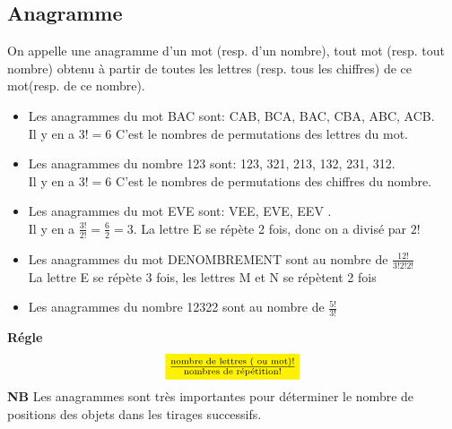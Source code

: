 \subsection*{Anagramme}
\begin{definition}
On appelle une  anagramme d'un mot (resp. d'un nombre), tout mot (resp. tout nombre) obtenu à partir de toutes les lettres (resp. tous les chiffres) de ce mot(resp. de ce nombre).
\end{definition}
\begin{example}
\begin{itemize}
\item Les anagrammes du mot BAC sont: CAB, BCA, BAC, CBA, ABC, ACB.\\
Il y en a $ 3!=6 $ C'est le nombres de permutations des lettres du mot.\\
\item Les anagrammes du nombre 123 sont: 123, 321, 213, 132, 231, 312.\\
Il y en a $ 3!=6 $ C'est le nombres de permutations des chiffres du nombre.\\
\item Les anagrammes du mot EVE sont: VEE, EVE, EEV .\\
Il y en a $ \frac{3!}{2!}=\frac{6}{2} =3$. La lettre E se répète  2 fois, donc on a divisé par $ 2! $ \\
\item Les anagrammes du mot DENOMBREMENT sont au nombre de $ \frac{12!}{3! 2!2!} $\\ La lettre E  se répète  3 fois, les lettres  M et N se répètent  2 fois \\
\item Les anagrammes du nombre 12322 sont au nombre de $ \frac{5!}{3!} $
\end{itemize}
\end{example}
\textbf{Régle}\\
\[ \colorbox{yellow}{$\frac{\textrm{nombre de lettres ( ou mot)!}}{\textrm{nombres de répétition!}}$}\]
\textbf{NB} Les anagrammes sont très importantes pour déterminer le nombre de positions des objets dans les tirages successifs.

